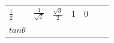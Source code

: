 {\begin{center}
\begin{xtabular*}{\mytablewidth}[t]{|p{10\mystarwidth}|p{10\mystarwidth}|p{10\mystarwidth}|p{10\mystarwidth}|p{10\mystarwidth}|p{10\mystarwidth}|p{10\mystarwidth}|}
    
        
                \begin{math}\frac{1}{2}\end{math}
               &
    
    
        
                \begin{math}\frac{1}{\sqrt{2}}\end{math}
               &
    
    
        
                \begin{math}\frac{\sqrt{3}}{2}\end{math}
               &
    
    
        1 &
    
    
        0%
     \tabularnewline{}
    
    
        
                \begin{math}tan\theta \end{math}
               &
    

\end{xtabular*}
\end{center}}
